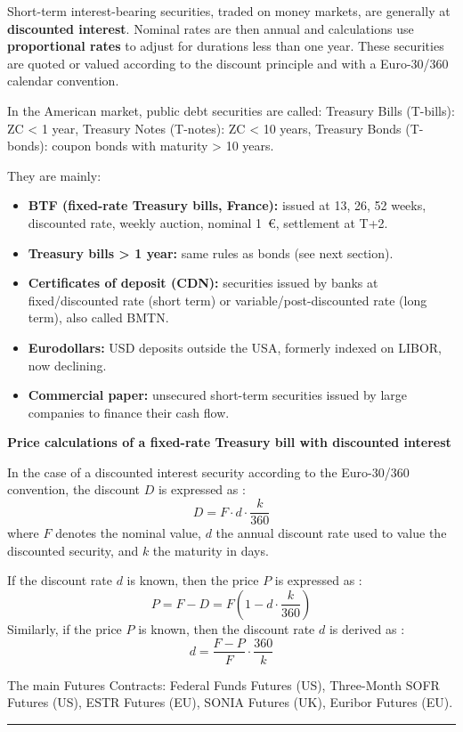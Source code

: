 \begin{f}
Short-term interest-bearing securities, traded on money markets, are generally at \textbf{discounted interest}. 
Nominal rates are then annual and calculations use \textbf{proportional rates} to adjust for durations less than one year.
These securities are quoted or valued according to the discount principle and with a Euro-30/360 calendar convention.

In the American market, public debt securities are called:
Treasury Bills (T-bills): ZC < 1 year, Treasury Notes (T-notes): ZC < 10 years,
Treasury Bonds (T-bonds): coupon bonds with maturity > 10 years.


They are mainly:
\begin{itemize}
	\item \textbf{BTF (fixed-rate Treasury bills, France):} issued at 13, 26, 52 weeks, discounted rate, weekly auction, nominal 1~€, settlement at T+2.
	
	\item \textbf{Treasury bills > 1 year:} same rules as bonds (see next section).
	
	\item \textbf{Certificates of deposit (CDN):} securities issued by banks at fixed/discounted rate (short term) or variable/post-discounted rate (long term), also called BMTN.
	
	\item \textbf{Eurodollars:} USD deposits outside the USA, formerly indexed on LIBOR, now declining.
	
	\item \textbf{Commercial paper:} unsecured short-term securities issued by large companies to finance their cash flow.
\end{itemize}

\textbf{Price calculations of a fixed-rate Treasury bill with discounted interest}

In the case of a discounted interest security according to the Euro-30/360 convention, the discount $D$ is expressed as :
$$
D=F \cdot d \cdot \frac{k}{360}
$$
where $F$ denotes the nominal value, $d$ the annual discount rate used to value the discounted security, and $k$ the maturity in days.

If the discount rate $d$ is known, then the price $P$ is expressed as :
$$
P=F-D=F\left(1-d \cdot \frac{k}{360}\right)
$$
Similarly, if the price $P$ is known, then the discount rate $d$ is derived as :
$$
d=\frac{F-P}{F} \cdot \frac{360}{k}
$$


The main Futures Contracts: Federal Funds Futures (US),
Three-Month SOFR Futures (US),
ESTR Futures (EU),
SONIA Futures (UK),
Euribor Futures (EU).

\end{f}
\hrule



